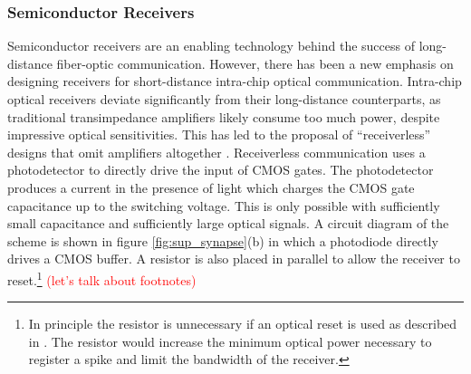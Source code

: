 \documentclass[twocolumn]{article}
\begin{document}
\subsubsection{Semiconductor Receivers}
\quad \quad Semiconductor receivers are an enabling technology behind the success of long-distance fiber-optic communication. However, there has been a new emphasis on designing receivers for short-distance intra-chip optical communication. Intra-chip optical receivers deviate significantly from their long-distance counterparts, as traditional transimpedance amplifiers likely consume too much power, despite impressive optical sensitivities. This has led to the proposal of ``receiverless'' designs that omit amplifiers altogether \cite{miller2017attojoule}. Receiverless communication uses a photodetector to directly drive the input of CMOS gates. The photodetector produces a current in the presence of light which charges the CMOS gate capacitance up to the switching voltage. This is only possible with sufficiently small capacitance and sufficiently large optical signals. A circuit diagram of the scheme is shown in figure \ref{fig:sup_synapse}(b) in which a photodiode directly drives a CMOS buffer. A resistor is also placed in parallel to allow the receiver to reset.\footnote{In principle the resistor is unnecessary if an optical reset is used as described in \cite{debaes2003receiver}. The resistor would increase the minimum optical power necessary to register a spike and limit the bandwidth of the receiver.} \textcolor{red}{(let's talk about footnotes)}
\end{document}
